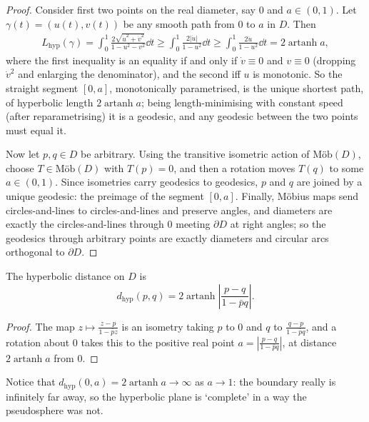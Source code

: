 \documentclass[a4paper]{scrartcl}
\newcommand{\Mob}{\text{M\"ob}}
\DeclareMathOperator{\artanh}{artanh}
\begin{document}
\begin{proof}
    Consider first two points on the real diameter, say $0$ and $a \in (0, 1)$. Let $\gamma(t) = (u(t), v(t))$ be any smooth path from $0$ to $a$ in $D$. Then
    \begin{align*}
    L_{\mathrm{hyp}}(\gamma) = \int_0^1 \frac{2\sqrt{\dot u^2 + \dot v^2}}{1 - u^2 - v^2} \dd t \geq \int_0^1 \frac{2 |\dot u|}{1 - u^2} \dd t \geq \int_0^1 \frac{2 \dot u}{1 - u^2} \dd t = 2 \artanh a,
    \end{align*}
    where the first inequality is an equality if and only if $\dot v \equiv 0$ and $v \equiv 0$ (dropping $\dot v^2$ and enlarging the denominator), and the second iff $u$ is monotonic. So the straight segment $[0, a]$, monotonically parametrised, is the unique shortest path, of hyperbolic length $2 \artanh a$; being length-minimising with constant speed (after reparametrising) it is a geodesic, and any geodesic between the two points must equal it.

    Now let $p, q \in D$ be arbitrary. Using the transitive isometric action of $\Mob(D)$, choose $T \in \Mob(D)$ with $T(p) = 0$, and then a rotation moves $T(q)$ to some $a \in (0, 1)$. Since isometries carry geodesics to geodesics, $p$ and $q$ are joined by a unique geodesic: the preimage of the segment $[0, a]$. Finally, M\"obius maps send circles-and-lines to circles-and-lines and preserve angles, and diameters are exactly the circles-and-lines through $0$ meeting $\partial D$ at right angles; so the geodesics through arbitrary points are exactly diameters and circular arcs orthogonal to $\partial D$.
\end{proof}

\begin{corollary}
    The hyperbolic distance on $D$ is
    $$
    d_{\mathrm{hyp}}(p, q) = 2 \artanh \left|\frac{p - q}{1 - \bar p q}\right|.
    $$
\end{corollary}
\begin{proof}
    The map $z \mapsto \frac{z - p}{1 - \bar p z}$ is an isometry taking $p$ to $0$ and $q$ to $\frac{q - p}{1 - \bar p q}$, and a rotation about $0$ takes this to the positive real point $a = \left|\frac{p - q}{1 - \bar p q}\right|$, at distance $2\artanh a$ from $0$.
\end{proof}

Notice that $d_{\mathrm{hyp}}(0, a) = 2 \artanh a \rightarrow \infty$ as $a \rightarrow 1$: the boundary really is infinitely far away, so the hyperbolic plane is `complete' in a way the pseudosphere was not.
\end{document}
